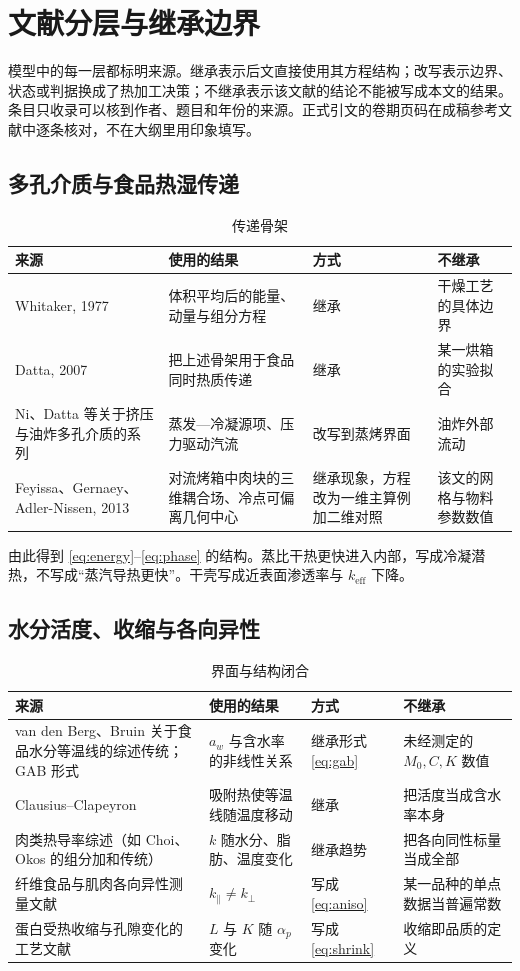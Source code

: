 \chapter{文献分层与继承边界}
\label{ch:lit}

模型中的每一层都标明来源。继承表示后文直接使用其方程结构；改写表示边界、状态或判据换成了热加工决策；不继承表示该文献的结论不能被写成本文的结果。条目只收录可以核到作者、题目和年份的来源。正式引文的卷期页码在成稿参考文献中逐条核对，不在大纲里用印象填写。

\section{多孔介质与食品热湿传递}

\begin{table}[H]
\centering
\caption{传递骨架}
\begin{tabularx}{\textwidth}{lXll}
\toprule
来源 & 使用的结果 & 方式 & 不继承 \\
\midrule
Whitaker, 1977 & 体积平均后的能量、动量与组分方程 & 继承 & 干燥工艺的具体边界 \\
Datta, 2007 & 把上述骨架用于食品同时热质传递 & 继承 & 某一烘箱的实验拟合 \\
Ni、Datta 等关于挤压与油炸多孔介质的系列 & 蒸发—冷凝源项、压力驱动汽流 & 改写到蒸烤界面 & 油炸外部流动 \\
Feyissa、Gernaey、Adler-Nissen, 2013 & 对流烤箱中肉块的三维耦合场、冷点可偏离几何中心 & 继承现象，方程改为一维主算例加二维对照 & 该文的网格与物料参数数值 \\
\bottomrule
\end{tabularx}
\end{table}

由此得到 \eqref{eq:energy}--\eqref{eq:phase} 的结构。蒸比干热更快进入内部，写成冷凝潜热，不写成“蒸汽导热更快”。干壳写成近表面渗透率与 $k_{\mathrm{eff}}$ 下降。

\section{水分活度、收缩与各向异性}

\begin{table}[H]
\centering
\caption{界面与结构闭合}
\begin{tabularx}{\textwidth}{lXll}
\toprule
来源 & 使用的结果 & 方式 & 不继承 \\
\midrule
van den Berg、Bruin 关于食品水分等温线的综述传统；GAB 形式 & $a_w$ 与含水率的非线性关系 & 继承形式 \eqref{eq:gab} & 未经测定的 $M_0,C,K$ 数值 \\
Clausius--Clapeyron & 吸附热使等温线随温度移动 & 继承 & 把活度当成含水率本身 \\
肉类热导率综述（如 Choi、Okos 的组分加和传统） & $k$ 随水分、脂肪、温度变化 & 继承趋势 & 把各向同性标量当成全部 \\
纤维食品与肌肉各向异性测量文献 & $k_\parallel\neq k_\perp$ & 写成 \eqref{eq:aniso} & 某一品种的单点数据当普遍常数 \\
蛋白受热收缩与孔隙变化的工艺文献 & $L$ 与 $K$ 随 $\alpha_p$ 变化 & 写成 \eqref{eq:shrink} & 收缩即品质的定义 \\
\bottomrule
\end{tabularx}
\end{table}

